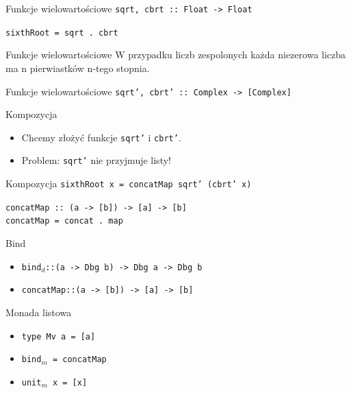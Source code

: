 \documentclass[14pt]{beamer}
\begin{document}
\begin{frame}{Funkcje wielowartościowe}
    \texttt{sqrt, cbrt :: Float -> Float}
    \pause

    \texttt{sixthRoot = sqrt . cbrt}
\end{frame}

\begin{frame}{Funkcje wielowartościowe}
    W przypadku liczb zespolonych każda niezerowa liczba ma n pierwiastków
    n-tego stopnia.
\end{frame}

\begin{frame}{Funkcje wielowartościowe}
    \texttt{sqrt', cbrt' :: Complex -> [Complex]}
\end{frame}

\begin{frame}{Kompozycja}
    \begin{itemize}
        \item Chcemy złożyć funkcje \texttt{sqrt'} i \texttt{cbrt'}.
        \item Problem: \texttt{sqrt'} nie przyjmuje listy!
    \end{itemize}
\end{frame}

\begin{frame}{Kompozycja}
    \texttt{sixthRoot x = concatMap sqrt' (cbrt' x)}

    \texttt{concatMap :: (a -> [b]) -> [a] -> [b]\\
    concatMap = concat . map}
\end{frame}

\begin{frame}{Bind}
    \begin{itemize}
        \item \texttt{bind$_d$::(a -> Dbg b) -> Dbg a -> Dbg b}
        \item \texttt{concatMap::(a -> [b]) -> [a] -> [b]}
    \end{itemize}
\end{frame}

\begin{frame}{Monada listowa}
    \begin{itemize}
        \item \texttt{type Mv a = [a]}
        \item \texttt{bind$_m$ = concatMap}
        \item \texttt{unit$_m$ x = [x]}
    \end{itemize}
\end{frame}
\end{document}
